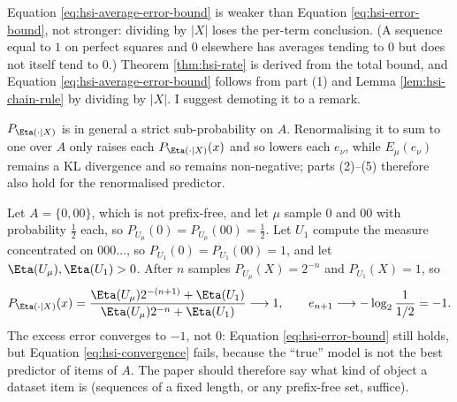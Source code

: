 \begin{remark}
Equation \ref{eq:hsi-average-error-bound} is weaker than Equation \ref{eq:hsi-error-bound}, not stronger: dividing by $|X|$ loses the per-term conclusion. (A sequence equal to $1$ on perfect squares and $0$ elsewhere has averages tending to $0$ but does not itself tend to $0$.) Theorem \ref{thm:hsi-rate} is derived from the total bound, and Equation \ref{eq:hsi-average-error-bound} follows from part (1) and Lemma \ref{lem:hsi-chain-rule} by dividing by $|X|$. I suggest demoting it to a remark.
\end{remark}

\begin{remark}[Normalisation]
$P_{\Eta(\cdot\mid X)}$ is in general a strict sub-probability on $A$. Renormalising it to sum to one over $A$ only raises each $P_{\Eta(\cdot\mid X)}(x)$ and so lowers each $e_\nu$, while $E_\mu(e_\nu)$ remains a KL divergence and so remains non-negative; parts (2)--(5) therefore also hold for the renormalised predictor.
\end{remark}

\begin{remark}[Assumption \ref{ass:hsi-rate}(ii) cannot be dropped]
Let $A=\{0,00\}$, which is not prefix-free, and let $\mu$ sample $0$ and $00$ with probability $\tfrac12$ each, so $P_{U_\mu}(0)=P_{U_\mu}(00)=\tfrac12$. Let $U_1$ compute the measure concentrated on $000\dots$, so $P_{U_1}(0)=P_{U_1}(00)=1$, and let $\Eta(U_\mu),\Eta(U_1)>0$. After $n$ samples $P_{U_\mu}(X)=2^{-n}$ and $P_{U_1}(X)=1$, so
\[
    P_{\Eta(\cdot\mid X)}(x)=\frac{\Eta(U_\mu)2^{-(n+1)}+\Eta(U_1)}{\Eta(U_\mu)2^{-n}+\Eta(U_1)}\longrightarrow 1,
    \qquad e_{n+1}\longrightarrow-\log_2\frac{1}{1/2}=-1 .
\]
The excess error converges to $-1$, not $0$: Equation \ref{eq:hsi-error-bound} still holds, but Equation \ref{eq:hsi-convergence} fails, because the ``true'' model is not the best predictor of items of $A$. The paper should therefore say what kind of object a dataset item is (sequences of a fixed length, or any prefix-free set, suffice).
\end{remark}

